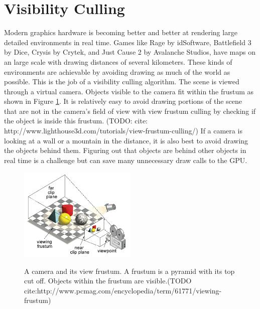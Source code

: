 \documentclass[12pt]{ucthesis}
\newcommand{\captionfonts}{\small\bf\ssp}
\begin{document}
\section{Visibility Culling}
\label{visibility-culling}

Modern graphics hardware is becoming better and better at rendering large detailed environments in real time.
Games like Rage by idSoftware, Battlefield 3 by Dice, Crysis by Crytek, and Just Cause 2 by Avalanche Studios, have maps on an large scale with drawing distances of several kilometers.
These kinds of environments are achievable by avoiding drawing as much of the world as possible.\cite{heir-occ-map, large-occluders, Vis-Computations-Densely-Occluded, Portal-culling, Cryengine-culling-explained, Portals-mirrors, dpvs, cryengine3, culling-bf, CHC, CHCpp}
This is the job of a visibility culling algorithm.
The scene is viewed through a virtual camera.
Objects visible to the camera fit within the frustum as shown in Figure \ref{fig:frustum}.
It is relatively easy to avoid drawing portions of the scene that are not in the camera's field of view with view frustum culling by checking if the object is inside this frustum.
(TODO: cite: http://www.lighthouse3d.com/tutorials/view-frustum-culling/)
If a camera is looking at a wall or a mountain in the distance, it is also best to avoid drawing the objects behind them.
Figuring out that objects are behind other objects in real time is a challenge but can save many unnecessary draw calls to the GPU.

\begin{figure}
\begin{center}
\includegraphics[width=0.5\textwidth]{Images/frustum.png}
\captionfonts
\caption[View Frustum]{A camera and its view frustum. A frustum is a pyramid with its top cut off. Objects within the frustum are visible.(TODO cite:http://www.pcmag.com/encyclopedia/term/61771/viewing-frustum)}
\label{fig:frustum}
\end{center}
\end{figure}
\end{document}

